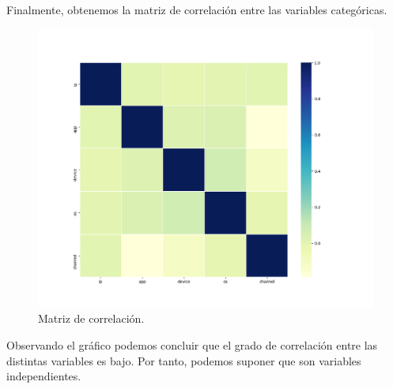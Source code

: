 Finalmente, obtenemos la matriz de correlación entre las variables categóricas. 
\begin{figure}[H]
	\centering
	\includegraphics[scale=0.45]{img/correlation.png}
	\caption{Matriz de correlación.}
\end{figure}
Observando el gráfico podemos concluir que el grado de correlación entre las distintas variables es bajo. Por tanto, podemos suponer que son variables independientes.